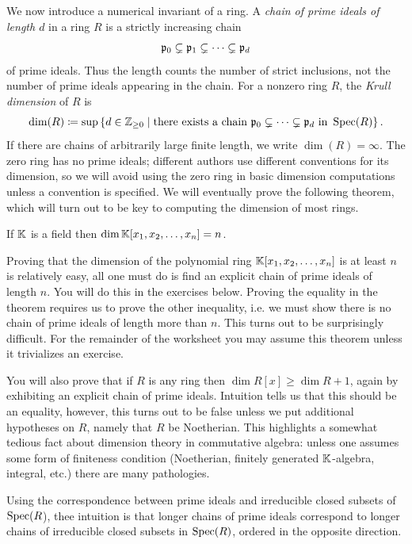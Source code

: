 \documentclass[12pt,reqno]{amsart}
\begin{document}
\begin{enumerate}[leftmargin=*, resume=problems]
\end{enumerate}

\hrulefill

We now introduce a numerical invariant of a ring. A \emph{chain of prime ideals of length $d$} in a ring $R$ is a strictly increasing chain
\[
\mathfrak{p}_0\subsetneq \mathfrak{p}_1\subsetneq \cdots \subsetneq \mathfrak{p}_d
\]
of prime ideals. Thus the length counts the number of strict inclusions, not the number of prime ideals appearing in the chain. For a nonzero ring $R$, the \emph{Krull dimension} of $R$ is
\[
\dim(R)
\coloneqq
\sup\left\{d\in\mathbb{Z}_{\geq 0}\;\middle|\;\text{there exists a chain }\mathfrak{p}_0\subsetneq\cdots\subsetneq\mathfrak{p}_d\text{ in }\operatorname{Spec}(R)\right\}.
\]
If there are chains of arbitrarily large finite length, we write $\dim(R)=\infty$. The zero ring has no prime ideals; different authors use different conventions for its dimension, so we will avoid using the zero ring in basic dimension computations unless a convention is specified. We will eventually prove the following theorem, which will turn out to be key to computing the dimension of most rings.

\begin{theorem}
	If $\mathbb{K}$ is a field then $\dim \mathbb{K}[x_1,x_2,\ldots,x_n]=n$.
\end{theorem}

Proving that the dimension of the polynomial ring $\mathbb{K}[x_1,x_2,\ldots,x_n]$ is at least $n$ is relatively easy, all one must do is find an explicit chain of prime ideals of length $n$. You will do this in the exercises below. Proving the equality in the theorem requires us to prove the other inequality, i.e. we must show there is no chain of prime ideals of length more than $n$. This turns out to be surprisingly difficult. For the remainder of the worksheet you may assume this theorem unless it trivializes an exercise. 

You will also prove that if $R$ is any ring then $\dim R[x] \geq \dim R + 1$, again by exhibiting an explicit chain of prime ideals. Intuition tells us that this should be an equality, however, this turns out to be false unless we put additional hypotheses on $R$, namely that $R$ be Noetherian. This highlights a somewhat tedious fact about dimension theory in commutative algebra: unless one assumes some form of finiteness condition (Noetherian, finitely generated $\mathbb{K}$-algebra, integral, etc.) there are many pathologies. 

Using the correspondence between prime ideals and irreducible closed subsets of $\operatorname{Spec}(R$), thee intuition is that longer chains of prime ideals correspond to longer chains of irreducible closed subsets in $\operatorname{Spec}(R)$, ordered in the opposite direction. 
\end{document}
